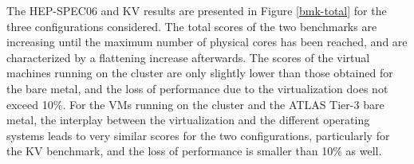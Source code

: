 The HEP-SPEC06 and KV results are presented in Figure \ref{bmk-total} for the three configurations considered.
The total scores of the two benchmarks are increasing until the maximum number of physical cores has been reached, and are characterized by a flattening increase afterwards.
The scores of the virtual machines running on the \NEMO cluster are only slightly lower than those obtained for the \NEMO bare metal, and the loss of performance
due to the virtualization does not exceed 10$\%$.
For the VMs running on the \NEMO cluster and the ATLAS Tier-3 bare metal, the interplay between the virtualization and the different operating systems leads to very similar scores
for the two configurations, particularly for the KV benchmark, and the loss of performance is smaller than 10$\%$ as well.


%
%
